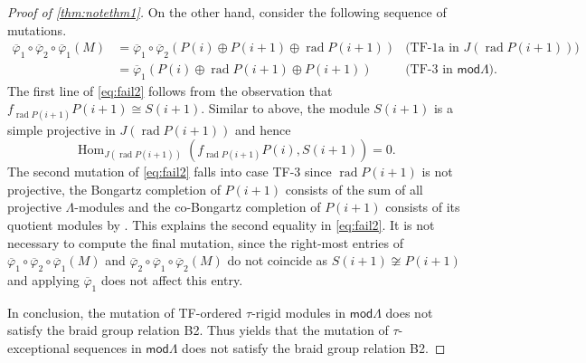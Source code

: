 \documentclass[11pt]{amsart}
\newcommand{\mods}{\mathsf{mod}}
\DeclareMathOperator{\Hom}{\mathrm{Hom}}
\DeclareMathOperator{\rad}{\mathrm{rad}}
\theoremstyle{definition}
\begin{document}
\begin{proof}[Proof of \cref{thm:notethm1}]
        On the other hand, consider the following sequence of mutations.
        \begin{equation}\label{eq:fail2}
        \begin{aligned}
            \overline{\varphi}_1 \circ \overline{\varphi}_2 \circ \overline{\varphi}_1(M) &= \overline{\varphi}_1 \circ  \overline{\varphi}_2(P(i) \oplus P(i+1) \oplus \rad P(i+1)) &\text{(TF-1a in $J(\rad P(i+1))$)} \\
            &= \overline{\varphi}_1( P(i) \oplus \rad P(i+1) \oplus P(i+1)) &\text{(TF-3 in $\mods \Lambda$)}.
        \end{aligned}
        \end{equation}
    The first line of \cref{eq:fail2} follows from the observation that $f_{\rad P(i+1)} P(i+1) \cong S(i+1)$. Similar to above, the module $S(i+1)$ is a simple projective in $J(\rad P(i+1))$ and hence 
    \[ \Hom_{J(\rad P(i+1))}(f_{\rad P(i+1)}P(i), S(i+1))=0. \]
    The second mutation of \cref{eq:fail2} falls into case TF-3 since $\rad P(i+1)$ is not projective, the Bongartz completion of $P(i+1)$ consists of the sum of all projective $\Lambda$-modules and the co-Bongartz completion of $P(i+1)$ consists of its quotient modules by \cite[Prop. 4.11]{bkt}. This explains the second equality in \cref{eq:fail2}. It is not necessary to compute the final mutation, since the right-most entries of $\overline{\varphi}_1 \circ \overline{\varphi}_2 \circ \overline{\varphi}_1(M)$ and $\overline{\varphi}_2 \circ \overline{\varphi}_1 \circ \overline{\varphi}_2(M)$ do not coincide as $S(i+1) \not \cong P(i+1)$ and applying $\overline{\varphi}_1$ does not affect this entry.

    In conclusion, the mutation of TF-ordered $\tau$-rigid modules in $\mods \Lambda$ does not satisfy the braid group relation B2. Thus \cite[Def. 3.28, Prop. 3.32]{bkt} yields that the mutation of $\tau$-exceptional sequences in $\mods \Lambda$ does not satisfy the braid group relation B2.
    \end{proof}


\printbibliography
\end{document}

